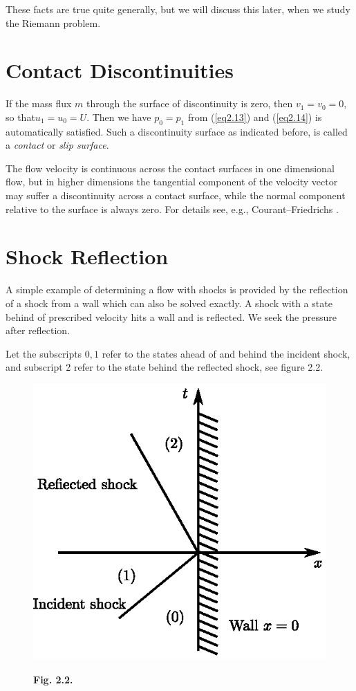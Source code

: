 These facts are true quite generally, but we will discuss this later, when we study the Riemann problem.

\section{Contact Discontinuities}\label{chap2:sec2.5}
If the mass flux $m$ through the surface of discontinuity is zero, then $v_1= v_0 = 0$, so that\pageoriginale $u_1 = u_0 = U$. Then we have $p_0 = p_1$ from (\ref{eq2.13}) and (\ref{eq2.14}) is automatically satisfied. Such a discontinuity surface as indicated before, is called a {\em contact} or {\em slip surface}.

The flow velocity is continuous across the contact surfaces in one dimensional flow, but in higher dimensions the tangential component of the velocity vector may suffer a discontinuity across a contact surface, while the normal component relative to the surface is always zero. For details see, e.g., Courant--Friedrichs \cite{key6}.

\section{Shock Reflection}\label{chap2:sec2.6}
A simple example of determining a flow with shocks is provided by the reflection of a shock from a wall which can also be solved exactly. A shock with a state behind of prescribed velocity hits a wall and is reflected. We seek the pressure after reflection.

Let the subscripts $0,1$ refer to the states ahead of and behind the incident shock, and subscript 2 refer to the state behind the reflected shock, see figure 2.2.
\newpage

\begin{figure}[H]
\centering
\includegraphics{figures/fig2.2.eps}
\centerline{\bf Fig. 2.2.}
\end{figure}


